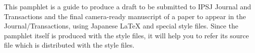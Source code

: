 \begin{abstract}
テスト
このパンフレットは，情報処理学会論文誌（以後，論文誌と呼ぶ）に投稿する論文，
並びに掲載が決定した論文の最終版を，日本語 {\LaTeX} を用いて作成し提出するた
めのガイドである．このパンフレットでは，論文作成のためのスタイルファイルにつ
いて解説している．また，このパンフレット自体も論文と同じ方法で作成されている
ので，必要に応じてスタイルファイルとともに配布するソース・ファイルを参照され
たい．
\end{abstract}
\begin{eabstract}
This pamphlet is a guide to produce a draft to be submitted to IPSJ Journal
and Transactions and the final camera-ready manuscript of a paper to appear
in the Journal\slash Transactions, using Japanese {\LaTeX} and special style
files.  Since the pamphlet itself is produced with the style files, it will
help you to refer its source file which is distributed with the style files.
\end{eabstract}
